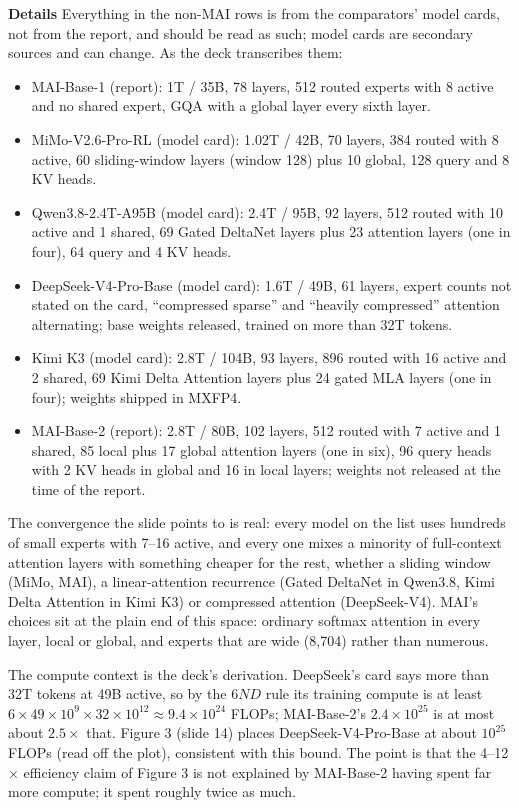 \documentclass[11pt,letterpaper]{article}
\newcommand{\para}[1]{\medskip\noindent\textbf{#1}\quad}
\begin{document}
\para{Details} Everything in the non-MAI rows is from the comparators' model cards, not from the report, and should be read as such; model cards are secondary sources and can change. As the deck transcribes them:
\begin{itemize}
\item MAI-Base-1 (report): 1T / 35B, 78 layers, 512 routed experts with 8 active and no shared expert, GQA with a global layer every sixth layer.
\item MiMo-V2.6-Pro-RL (model card): 1.02T / 42B, 70 layers, 384 routed with 8 active, 60 sliding-window layers (window 128) plus 10 global, 128 query and 8 KV heads.
\item Qwen3.8-2.4T-A95B (model card): 2.4T / 95B, 92 layers, 512 routed with 10 active and 1 shared, 69 Gated DeltaNet layers plus 23 attention layers (one in four), 64 query and 4 KV heads.
\item DeepSeek-V4-Pro-Base (model card): 1.6T / 49B, 61 layers, expert counts not stated on the card, ``compressed sparse'' and ``heavily compressed'' attention alternating; base weights released, trained on more than 32T tokens.
\item Kimi K3 (model card): 2.8T / 104B, 93 layers, 896 routed with 16 active and 2 shared, 69 Kimi Delta Attention layers plus 24 gated MLA layers (one in four); weights shipped in MXFP4.
\item MAI-Base-2 (report): 2.8T / 80B, 102 layers, 512 routed with 7 active and 1 shared, 85 local plus 17 global attention layers (one in six), 96 query heads with 2 KV heads in global and 16 in local layers; weights not released at the time of the report.
\end{itemize}
The convergence the slide points to is real: every model on the list uses hundreds of small experts with 7--16 active, and every one mixes a minority of full-context attention layers with something cheaper for the rest, whether a sliding window (MiMo, MAI), a linear-attention recurrence (Gated DeltaNet in Qwen3.8, Kimi Delta Attention in Kimi K3) or compressed attention (DeepSeek-V4). MAI's choices sit at the plain end of this space: ordinary softmax attention in every layer, local or global, and experts that are wide (8,704) rather than numerous.

The compute context is the deck's derivation. DeepSeek's card says more than 32T tokens at 49B active, so by the $6ND$ rule its training compute is at least $6\times49\times10^{9}\times32\times10^{12}\approx9.4\times10^{24}$ FLOPs; MAI-Base-2's $2.4\times10^{25}$ is at most about $2.5\times$ that. Figure 3 (slide 14) places DeepSeek-V4-Pro-Base at about $10^{25}$ FLOPs (read off the plot), consistent with this bound. The point is that the 4--12$\times$ efficiency claim of Figure 3 is not explained by MAI-Base-2 having spent far more compute; it spent roughly twice as much.
\end{document}
